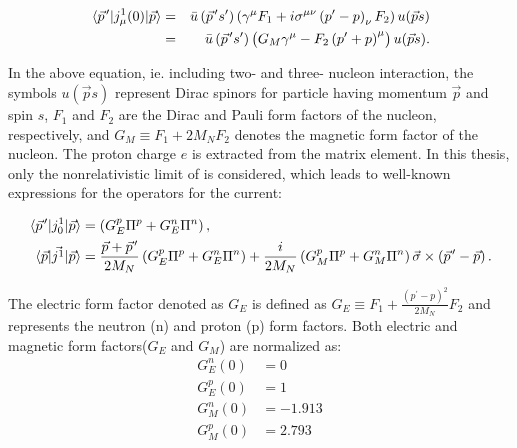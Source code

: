     \begin{equation}
        \begin{aligned}
        \matrixel{\pvec{p}} {j^1_\mu(0)} {\vec{p}} & =& \bar{u}\left(\pvec{p} s^{\prime}\right)\left(\gamma^\mu F_1+i \sigma^{\mu \nu}\left(p^{\prime}-p\right)_\nu F_2\right) u(\vec{p} s) \\
        & =&\bar{u}\left(\pvec{p} s^{\prime}\right)\left(G_M \gamma^\mu-F_2\left(p^{\prime}+p\right)^\mu\right) u(\vec{p} s) .
        \end{aligned}
        \label{current_general}       
    \end{equation}
    
    In the above equation,
    ie. including two- and three- nucleon interaction, the symbols $u(\vec{p} s)$ represent Dirac spinors
    for particle having momentum $\vec{p}$ and spin $s$, 
    $F_1$ and $F_2$ are the Dirac and Pauli form factors of the nucleon, respectively, and $G_M \equiv F_1+2 M_N F_2$ denotes the magnetic form factor of the nucleon. The proton charge $e$ is extracted from the matrix element. In this thesis, only the nonrelativistic limit of  is considered, which leads to well-known expressions for the operators for the current:


    \begin{align}
            \matrixel*{\pvec{p}} {j^1_0} {\vec{p}} &=\left(G_E^p \Pi^p+G_E^n \Pi^n\right), \\
            \matrixel{\vec{p}} {\vec{j^1}} {\vec{p}} &=\frac{\vec{p}+\pvec{p}}{2 M_N}\left(G_E^p \Pi^p+G_E^n \Pi^n\right)+\frac{i}{2 M_N}\left(G_M^p \Pi^p+G_M^n \Pi^n\right) \vec{\sigma} \times\left(\pvec{p}-\vec{p}\right) .
        \label{snc_formfact}
    \end{align}

    The electric form factor denoted as $G_E$ is defined as
    $G_E \equiv F_1+\frac{\left(p^{\prime}-p\right)^2}{2 M_N} F_2$ and 
    represents the neutron (n) and proton (p) form factors.
    Both electric and magnetic form factors($G_E$ and $G_M$) are normalized as:
    \begin{equation}
        \begin{aligned}
        G_E^n(0) & =0 \\
        G_E^p(0) & =1 \\
        G_M^n(0) & =-1.913 \\
        G_M^p(0) & =2.793
        \end{aligned}
    \end{equation}

